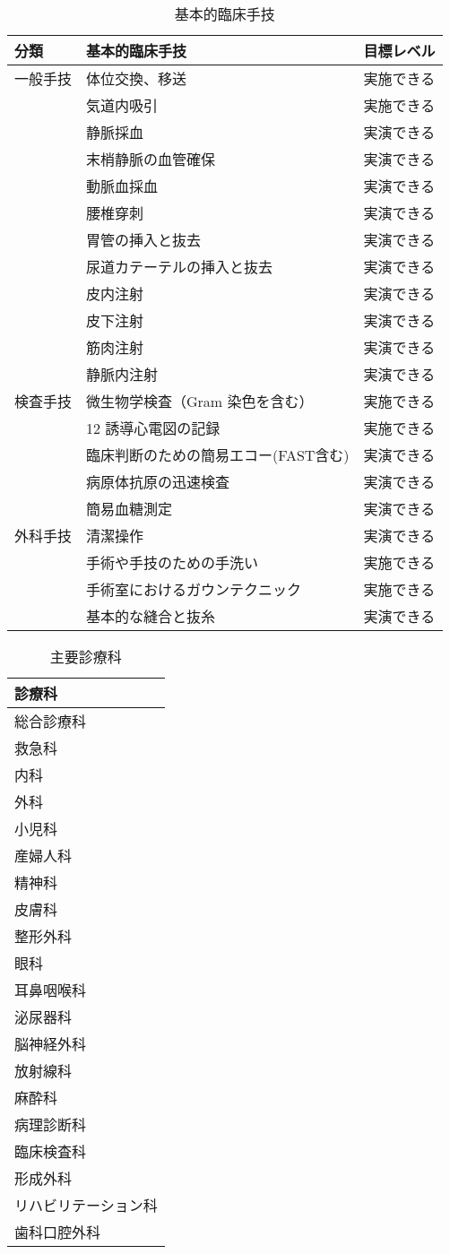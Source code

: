 \begin{xltabular}{\linewidth}{XXX}
\caption{\label{tbl:基本的臨床手技}基本的臨床手技} \\
\toprule
分類 & 基本的臨床手技 & 目標レベル \\
\midrule
\endhead
一般手技 & 体位交換、移送 & 実施できる \\
 & 気道内吸引 & 実施できる \\
 & 静脈採血 & 実演できる \\
 & 末梢静脈の血管確保 & 実演できる \\
 & 動脈血採血 & 実演できる \\
 & 腰椎穿刺 & 実演できる \\
 & 胃管の挿入と抜去 & 実演できる \\
 & 尿道カテーテルの挿入と抜去 & 実演できる \\
 & 皮内注射 & 実演できる \\
 & 皮下注射 & 実演できる \\
 & 筋肉注射 & 実演できる \\
 & 静脈内注射 & 実演できる \\
検査手技 & 微生物学検査（Gram 染色を含む） & 実施できる \\
 & 12 誘導心電図の記録 & 実施できる \\
 & 臨床判断のための簡易エコー(FAST含む) & 実演できる \\
 & 病原体抗原の迅速検査 & 実演できる \\
 & 簡易血糖測定 & 実演できる \\
外科手技 & 清潔操作 & 実演できる \\
 & 手術や手技のための手洗い & 実施できる \\
 & 手術室におけるガウンテクニック & 実施できる \\
 & 基本的な縫合と抜糸 & 実演できる \\
\bottomrule
\end{xltabular}

\begin{xltabular}{\linewidth}{X}
\caption{\label{tbl:主要診療科}主要診療科} \\
\toprule
診療科 \\
\midrule
\endhead
総合診療科 \\
救急科 \\
内科 \\
外科 \\
小児科 \\
産婦人科 \\
精神科 \\
皮膚科 \\
整形外科 \\
眼科 \\
耳鼻咽喉科 \\
泌尿器科 \\
脳神経外科 \\
放射線科 \\
麻酔科 \\
病理診断科 \\
臨床検査科 \\
形成外科 \\
リハビリテーション科 \\
歯科口腔外科 \\
\bottomrule
\end{xltabular}

